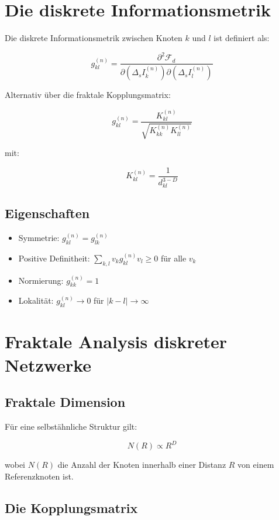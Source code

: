\section{Die diskrete Informationsmetrik}

Die diskrete Informationsmetrik zwischen Knoten \( k \) und \( l \) ist definiert als:

\[
g_{kl}^{(n)} = \frac{\partial^2 \mathcal{F}_d}{\partial (\Delta_s I_k^{(n)}) \partial (\Delta_s I_l^{(n)})}
\]

Alternativ über die fraktale Kopplungsmatrix:

\[
g_{kl}^{(n)} = \frac{K_{kl}^{(n)}}{\sqrt{K_{kk}^{(n)} K_{ll}^{(n)}}}
\]

mit:

\[
K_{kl}^{(n)} = \frac{1}{d_{kl}^{3-D}}
\]

\subsection{Eigenschaften}

\begin{itemize}
\item Symmetrie: \( g_{kl}^{(n)} = g_{lk}^{(n)} \)
\item Positive Definitheit: \( \sum_{k,l} v_k g_{kl}^{(n)} v_l \ge 0 \) für alle \( v_k \)
\item Normierung: \( g_{kk}^{(n)} = 1 \)
\item Lokalität: \( g_{kl}^{(n)} \to 0 \) für \( |k-l| \to \infty \)
\end{itemize}

\section{Fraktale Analysis diskreter Netzwerke}

\subsection{Fraktale Dimension}

Für eine selbstähnliche Struktur gilt:

\[
N(R) \propto R^D
\]

wobei \( N(R) \) die Anzahl der Knoten innerhalb einer Distanz \( R \) von einem Referenzknoten ist.

\subsection{Die Kopplungsmatrix}


